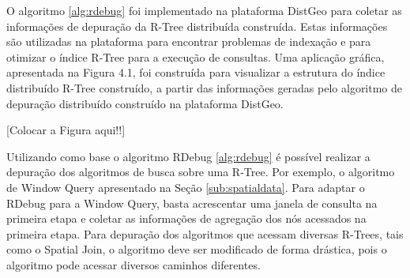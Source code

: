 O algoritmo \ref{alg:rdebug} foi implementado na plataforma DistGeo para coletar as informações de depuração da R-Tree distribuída construída. Estas informações são utilizadas na plataforma para encontrar problemas de indexação e para otimizar o índice R-Tree para a execução de consultas. Uma aplicação gráfica, apresentada na Figura 4.1, foi construída para visualizar a estrutura do índice distribuído R-Tree construído, a partir das informações geradas pelo algoritmo de depuração distribuído construído na plataforma DistGeo.

[Colocar a Figura aqui!!]

Utilizando como base o algoritmo RDebug \ref{alg:rdebug} é possível realizar a depuração dos algoritmos de busca sobre uma R-Tree. Por exemplo, o algoritmo de Window Query apresentado na Seção \ref{sub:spatialdata}. Para adaptar o RDebug para a Window Query, basta acrescentar uma janela de consulta na primeira etapa e coletar as informações de agregação dos nós acessados na primeira etapa. Para depuração dos algoritmos que acessam diversas R-Trees, tais como o Spatial Join, o algoritmo deve ser modificado de forma drástica, pois o algoritmo pode acessar diversos caminhos diferentes.
